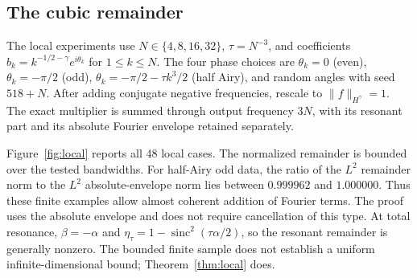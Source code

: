 \documentclass[11pt]{article}
\theoremstyle{remark}\newtheorem{remark}[theorem]{Remark}
\newcommand{\sinc}{\operatorname{sinc}}
\begin{document}
\subsection{The cubic remainder}
The local experiments use $N\in\{4,8,16,32\}$,
$\tau=N^{-3}$, and coefficients
$b_k=k^{-1/2-\gamma}e^{i\theta_k}$ for $1\leq k\leq N$.
The four phase choices are $\theta_k=0$ (even),
$\theta_k=-\pi/2$ (odd), $\theta_k=-\pi/2-\tau k^3/2$
(half Airy), and random angles with seed $518+N$.
After adding conjugate negative frequencies, rescale to
$\|f\|_{H^\gamma}=1$. The exact multiplier is summed through output
frequency $3N$, with its resonant part and its absolute Fourier
envelope retained separately.

Figure~\ref{fig:local} reports all 48 local cases. The normalized
remainder is bounded over the tested bandwidths. For half-Airy odd data,
the ratio of the $L^2$ remainder norm to the $L^2$ absolute-envelope norm
lies between $0.999962$ and $1.000000$. Thus these finite examples allow
almost coherent addition of Fourier terms. The proof uses the absolute
envelope and does not require cancellation of this type.
At total resonance, $\beta=-\alpha$ and
$\eta_\tau=1-\sinc^2(\tau\alpha/2)$, so the resonant remainder is
generally nonzero. The bounded finite sample does not establish a
uniform infinite-dimensional bound; Theorem~\ref{thm:local} does.
\end{document}
